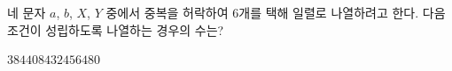 네 문자 $a$, $b$, $X$, $Y$ 중에서 중복을 허락하여 $6$개를 택해 일렬로 나열하려고 한다. 다음 조건이 성립하도록 나열하는 경우의 수는? 
\begin{choices32}{$384$}{$408$}{$432$}{$456$}{$480$}\end{choices32}

